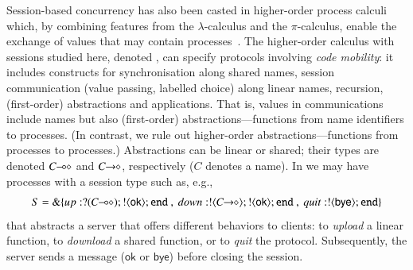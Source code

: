 Session-based concurrency has also been casted in {higher-order} process
calculi which, by combining features from the $\lambda$-calculus and the $\pi$-calculus, 
enable the exchange of values 
that may contain processes~\cite{tlca07,DBLP:journals/jfp/GayV10}. 
The higher-order calculus with sessions studied here, denoted \HOp,
can specify protocols involving \emph{code mobility}: it includes
constructs for 
synchronisation along shared names, 
session communication (value passing, labelled choice) along linear names,
recursion, 
 (first-order) abstractions 
 and applications.
 That is, 
 values in communications include names but also (first-order) abstractions---functions from name identifiers to processes. 
 (In contrast, we rule out higher-order abstractions---functions from processes to processes.)
Abstractions can be linear or shared; their types are  denoted $C\!\! \multimap\!\! \diamond$ and $C\!\! \rightarrow\!\! \diamond$, respectively ($C$ 
denotes a name). In \HOp we may have processes with a 
session type such as, e.g.,
$$S = \btbra{up:\btinp{\lhot{C}}\btout{\mathsf{ok}}\tinact ~ , ~ down:\btout{\shot{C}}\btout{\mathsf{ok}}\tinact ~ , ~quit:\btout{\mathsf{bye}}\tinact}_{}$$
that abstracts a server that offers different behaviors to clients: 
  to \emph{upload} a linear function, %
  to \emph{download} a shared function, %
   or to \emph{quit} the protocol. Subsequently, 
  the server sends a message ($\mathsf{ok}$ or $\mathsf{bye}$) before closing the session.



